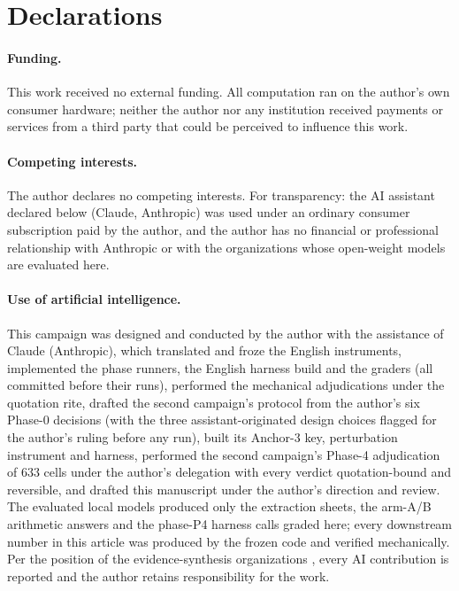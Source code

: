 \documentclass[11pt]{article}
\begin{document}
\section*{Declarations}

\paragraph{Funding.} This work received no external funding. All computation ran on the author's own consumer hardware; neither the author nor any institution received payments or services from a third party that could be perceived to influence this work.

\paragraph{Competing interests.} The author declares no competing interests. For transparency: the AI assistant declared below (Claude, Anthropic) was used under an ordinary consumer subscription paid by the author, and the author has no financial or professional relationship with Anthropic or with the organizations whose open-weight models are evaluated here.

\paragraph{Use of artificial intelligence.} This campaign was designed and conducted by the author with the assistance of Claude (Anthropic), which translated and froze the English instruments, implemented the phase runners, the English harness build and the graders (all committed before their runs), performed the mechanical adjudications under the quotation rite, drafted the second campaign's protocol from the author's six Phase-0 decisions (with the three assistant-originated design choices flagged for the author's ruling before any run), built its Anchor-3 key, perturbation instrument and harness, performed the second campaign's Phase-4 adjudication of 633 cells under the author's delegation with every verdict quotation-bound and reversible, and drafted this manuscript under the author's direction and review. The evaluated local models produced only the extraction sheets, the arm-A/B arithmetic answers and the phase-P4 harness calls graded here; every downstream number in this article was produced by the frozen code and verified mechanically. Per the position of the evidence-synthesis organizations \citep{flemyng2025position}, every AI contribution is reported and the author retains responsibility for the work.
\end{document}
